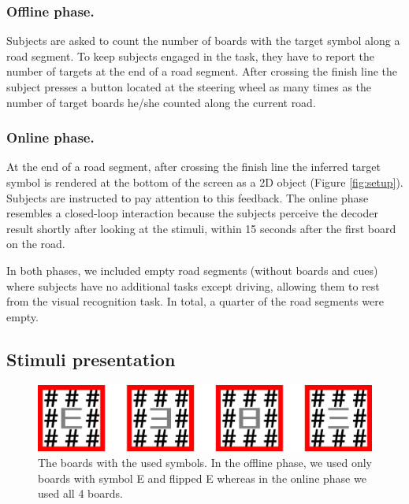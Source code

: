 \documentclass[12pt]{iopart}
\begin{document}

\subsubsection*{Offline phase.}
Subjects are asked to count the number of boards with the target symbol along a road segment. To keep subjects engaged in the task, they have to report the number of targets at the end of a road segment. After crossing the finish line the subject presses 
a button located at the steering wheel as many times
as the number of target boards he/she counted along the current road.

\subsubsection*{Online phase.}
At the end of a road segment, after crossing the finish line the inferred target symbol is rendered at the bottom of the screen as a 2D object (Figure \ref{fig:setup}). Subjects are instructed to pay attention to this feedback. 
The online phase resembles a closed-loop interaction because
the subjects perceive the decoder result shortly after
looking at the stimuli, within 15 seconds after the first board on the road.

In both phases, we included empty road segments (without boards and cues) where subjects have no additional tasks 
except driving, allowing them to rest from the visual recognition task.
In total, a quarter of the road segments were empty.

\subsection{Stimuli presentation}
\label{sec:stim}

\begin{figure}[!t]
\center
    \includegraphics[trim={0cm 0cm 0cm 0cm},clip,width=0.80\columnwidth]{../images/Stimuli.png}
    \caption{The boards with the used symbols. In the offline phase, we used only boards 
        with symbol E and flipped E whereas in the online phase we used all 4 boards.}
\label{fig:boards}
\end{figure}
\end{document}
